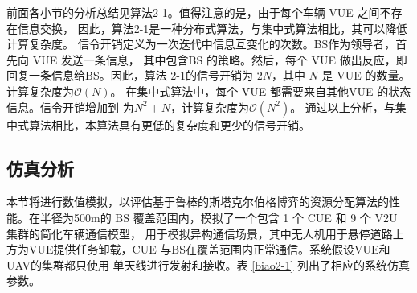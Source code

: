 前面各小节的分析总结见算法2-1。值得注意的是，由于每个车辆 VUE 之间不存在信息交换，
因此，算法2-1是一种分布式算法，与集中式算法相比，其可以降低计算复杂度。
信令开销定义为一次迭代中信息互变化的次数。BS作为领导者，首先向  VUE 发送一条信息， 其中包含BS
的策略。然后，每个 VUE  做出反应，即回复一条信息给BS。因此，算法 2-1的信号开销为 $2N$，其中
$N$ 是  VUE  的数量。计算复杂度为$\mathcal{O}\left(N\right)$。 在集中式算法中，每个 VUE
都需要来自其他VUE 的状态信息。信令开销增加到 为$N^2+N$，计算复杂度为$\mathcal{O}\left(N^2\right)$。
通过以上分析，与集中式算法相比，本算法具有更低的复杂度和更少的信号开销。
\subsection{仿真分析}\label{section2-4-2}
本节将进行数值模拟，以评估基于鲁棒的斯塔克尔伯格博弈的资源分配算法的性能。在半径为500m的 BS 覆盖范围内，模拟了一个包含 1 个 CUE 和 9 个 V2U 集群的简化车辆通信模型，
用于模拟异构通信场景，其中无人机用于悬停道路上方为VUE提供任务卸载，CUE 与BS在覆盖范围内正常通信。系统假设VUE和 UAV的集群都只使用
单天线进行发射和接收。表 \ref{biao2-1} 列出了相应的系统仿真参数。

